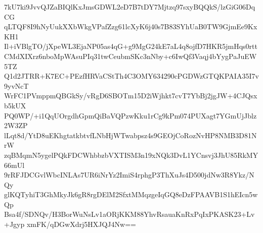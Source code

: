 7kU7ki9JvvQJZaBIQlKxJmsGDWL2eD7B7tDY7Mjtzq97sxyBQQkS/lzGiG06DqCG
qLTQF8I9hNyUukXXbWkgVPafZzg61lcXyK6j40s7B83SYhUaB0TW9GjmEe9KxKH1
Il+iVBlgTO/jXpeWL3EjaNP05as4qG+g9MgG24kE7aL4q8ojfD7HKR5jmHqs0rtt
CMdXIXrz6nboMpWAsuPIq31twCeubmSKc3nNby+c6IwQf3Vaqj4bYygPaJuEW5TZ
Q1d2JTRR+K7EC+PEzfHRVaCStTh4C3OMY634290cPGDWzGTQKPAIA35I7v9yvNcT
WrFC1PVmppmQBGkSy/vRgD6SBOTm15D2iWjhkt7cvT7YbBj2jgJW+4CJQsxb5kUX
PQ0WP/+i1QqUOrgdhGpmQiBaVQPzwKku1rCg9kPm074PUXagt7YGmUjJblz2W3ZP
lLqt8d/YtD8uEKhgtatkbtvfLNbHjWTwabpsz4s9GEOjCoRozNvHP8NMB3D81NrW
zqBMqmN5ygelPQkFDCWhbbzbVXTISM3n19xNQk3DvL1YCnsvj3JhU85RkMY66mUl
9rRFJDCGvlWbcINLAs7UR6iNrYz2ImiS4rphgP3ThXuJs4D500jdNw3R8Ykz/NQy
glKQTyhiT3GhMkyJk6gR8rgDElM2SfxtMMqzgeIqGQ8eDzFPAAVB1S1hEIcn5wQp
Bsa4f/SDNQv/H3BorWuNsLv1aORjKKM88YhvRsauaKnRxPqIxPKASK23+Lv+Jgyp
xmFK/qDGwXdrj5HXJQJ4Nw==
